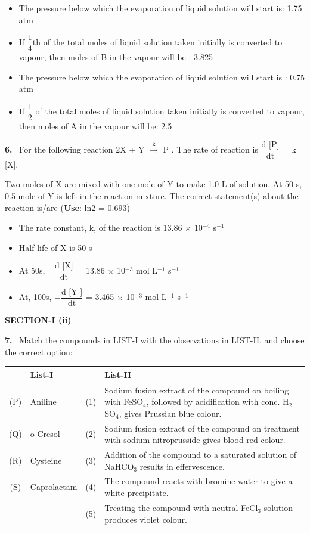 \documentclass[10pt]{extarticle}
\newcommand{\sect}[1]{\par\smallskip\noindent\textbf{#1}\par}
\newcommand{\qn}[1]{\par\smallskip\noindent\textbf{#1.}~}
\newenvironment{qoptions}{\begin{itemize}[leftmargin=1.8em,itemsep=1pt,topsep=2pt,label={}]}{\end{itemize}}
\newcommand{\opt}[2]{\item[(#1)] #2}
\begin{document}
\begin{multicols}{2}
\begin{qoptions}
\opt{A}{The pressure below which the evaporation of liquid solution will start is: 1.75 atm}
\opt{B}{If $\dfrac{1}{4}$th of the total moles of liquid solution taken initially is converted to vapour, then moles of B in the vapour will be : 3.825}
\opt{C}{The pressure below which the evaporation of liquid solution will start is : 0.75 atm}
\opt{D}{If $\dfrac{1}{2}$ of the total moles of liquid solution taken initially is converted to vapour, then moles of A in the vapour will be: 2.5}
\end{qoptions}
\qn{6} For the following reaction 2X + Y $\xrightarrow{\text{k}}$ P . The rate of reaction is $\dfrac{\text{d [P]}}{\text{dt}}$ = k [X].\par
Two moles of X are mixed with one mole of Y to make 1.0 L of solution. At 50 s, 0.5 mole of Y is left in the reaction mixture. The correct statement(s) about the reaction is/are (\textbf{Use}: ln2 = 0.693)
\begin{qoptions}
\opt{A}{The rate constant, k, of the reaction is 13.86 $\times$ 10$^{-4}$ s$^{-1}$}
\opt{B}{Half-life of X is 50 s}
\opt{C}{At 50s, $-\dfrac{\text{d [X]}}{\text{dt}}$ = 13.86 $\times$ 10$^{-3}$ mol L$^{-1}$ s$^{-1}$}
\opt{D}{At, 100s, $-\dfrac{\text{d [Y ]}}{\text{dt}}$ = 3.465 $\times$ 10$^{-3}$ mol L$^{-1}$ s$^{-1}$}
\end{qoptions}
\sect{SECTION-I (ii)}
\qn{7} Match the compounds in LIST-I with the observations in LIST-II, and choose the correct option:\par
{\footnotesize\setlength{\tabcolsep}{1.5pt}\noindent\begin{tabular}{|c|L{1.9cm}|c|L{4.0cm}|}
\hline
 & List-I & & List-II \\
\hline
(P) & Aniline & (1) & Sodium fusion extract of the compound on boiling with FeSO$_4$, followed by acidification with conc. H$_2$SO$_4$, gives Prussian blue colour. \\
\hline
(Q) & o-Cresol & (2) & Sodium fusion extract of the compound on treatment with sodium nitroprusside gives blood red colour. \\
\hline
(R) & Cysteine & (3) & Addition of the compound to a saturated solution of NaHCO$_3$ results in effervescence. \\
\hline
(S) & Caprolactam & (4) & The compound reacts with bromine water to give a white precipitate. \\
\hline
 & & (5) & Treating the compound with neutral FeCl$_3$ solution produces violet colour. \\
\hline
\end{tabular}}\par

\end{multicols}
\end{document}
